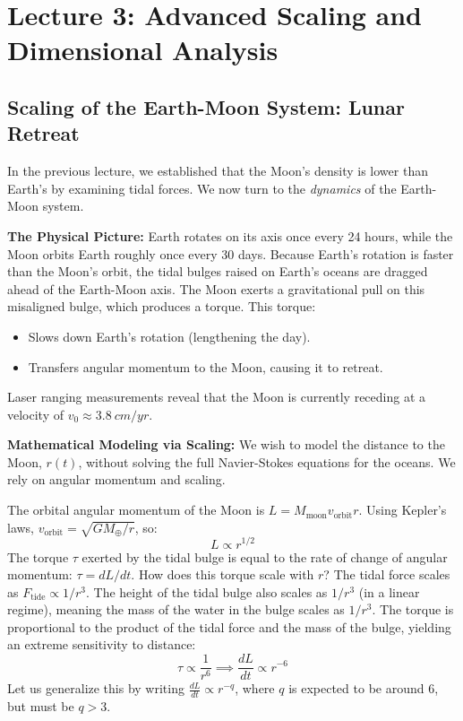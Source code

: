 \section{Lecture 3: Advanced Scaling and Dimensional Analysis}
\date{23/04/2026}

\subsection{Scaling of the Earth-Moon System: Lunar Retreat}

In the previous lecture, we established that the Moon's density is lower than Earth's by examining tidal forces. We now turn to the \emph{dynamics} of the Earth-Moon system. 

\textbf{The Physical Picture:}
Earth rotates on its axis once every 24 hours, while the Moon orbits Earth roughly once every 30 days. Because Earth's rotation is faster than the Moon's orbit, the tidal bulges raised on Earth's oceans are dragged ahead of the Earth-Moon axis. The Moon exerts a gravitational pull on this misaligned bulge, which produces a torque. This torque:
\begin{itemize}
    \item Slows down Earth's rotation (lengthening the day).
    \item Transfers angular momentum to the Moon, causing it to retreat.
\end{itemize}
Laser ranging measurements reveal that the Moon is currently receding at a velocity of $v_0 \approx \SI{3.8}{cm/yr}$. 

\textbf{Mathematical Modeling via Scaling:}
We wish to model the distance to the Moon, $r(t)$, without solving the full Navier-Stokes equations for the oceans. We rely on angular momentum and scaling.

The orbital angular momentum of the Moon is $L = M_\text{moon} v_\text{orbit} r$. Using Kepler's laws, $v_\text{orbit} = \sqrt{GM_\oplus/r}$, so:
\[
    L \propto r^{1/2}
\]
The torque $\tau$ exerted by the tidal bulge is equal to the rate of change of angular momentum: $\tau = dL/dt$. How does this torque scale with $r$?
The tidal force scales as $F_\text{tide} \propto 1/r^3$. The height of the tidal bulge also scales as $1/r^3$ (in a linear regime), meaning the mass of the water in the bulge scales as $1/r^3$. The torque is proportional to the product of the tidal force and the mass of the bulge, yielding an extreme sensitivity to distance:
\[
    \tau \propto \frac{1}{r^6} \implies \frac{dL}{dt} \propto r^{-6}
\]
Let us generalize this by writing $\frac{dL}{dt} \propto r^{-q}$, where $q$ is expected to be around $6$, but must be $q > 3$. 

